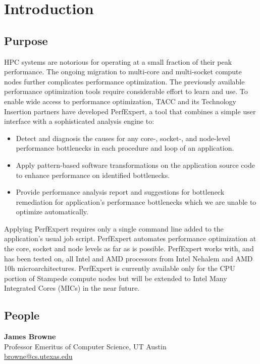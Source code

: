 \chapter{Introduction}

\section{Purpose}

HPC systems are notorious for operating at a small fraction of their peak performance. The ongoing migration to multi-core and multi-socket compute nodes further complicates performance optimization. The previously available performance optimization tools require considerable effort to learn and use. To enable wide access to performance optimization, TACC and its Technology Insertion partners have developed PerfExpert, a tool that combines a simple user interface with a sophisticated analysis engine to:

\begin{itemize}
  \item Detect and diagnosis the causes for any core-, socket-, and node-level performance bottlenecks in each procedure and loop of an application.
  \item Apply pattern-based software transformations on the application source code to enhance performance on identified bottlenecks.
  \item Provide performance analysis report and suggestions for bottleneck remediation for application's performance bottlenecks which we are unable to optimize automatically.
\end{itemize}

Applying PerfExpert requires only a single command line added to the application's usual job script. PerfExpert automates performance optimization at the core, socket and node levels as far as is possible. PerfExpert works with, and has been tested on, all Intel and AMD processors from Intel Nehalem and AMD 10h microarchitectures. PerfExpert is currently available only for the CPU portion of Stampede compute nodes but will be extended to Intel Many Integrated Cores (MICs) in the near future.

\section{People}

\textbf{James Browne}\\
Professor Emeritus of Computer Science, UT Austin\\
\href{mailto:browne@cs.utexas.edu}{browne@cs.utexas.edu}\\

